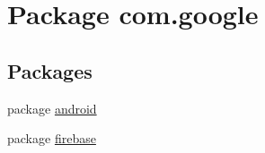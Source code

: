 \hypertarget{namespacecom_1_1google}{}\section{Package com.\+google}
\label{namespacecom_1_1google}
\subsection*{Packages}
\begin{DoxyCompactItemize}
\item 
package \mbox{\hyperlink{namespacecom_1_1google_1_1android}{android}}
\item 
package \mbox{\hyperlink{namespacecom_1_1google_1_1firebase}{firebase}}
\end{DoxyCompactItemize}
